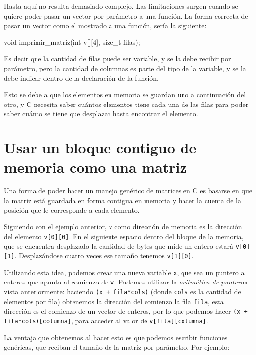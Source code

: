 Hasta aquí no resulta demasiado complejo.  Las limitaciones surgen cuando
se quiere poder pasar un vector por parámetro a una función.  La forma
correcta de pasar un vector como el mostrado a una función, sería la
siguiente:

\begin{codigo-c-plano}
void imprimir_matriz(int v[][4], size_t filas);
\end{codigo-c-plano}

Es decir que la cantidad de filas puede ser variable, y se la debe recibir
por parámetro, pero la cantidad de columnas es parte del tipo de la
variable, y se la debe indicar dentro de la declaración de la función.

Esto se debe a que los elementos en memoria se guardan uno a continuación
del otro, y C necesita saber cuántos elementos tiene cada una de las
filas para poder saber cuánto se tiene que desplazar hasta encontrar el
elemento.

\section{Usar un bloque contiguo de memoria como una matriz}

Una forma de poder hacer un manejo genérico de matrices en C es basarse en que
la matriz está guardada en forma contigua en memoria y hacer la cuenta de la
posición que le corresponde a cada elemento.

Siguiendo con el ejemplo anterior, \lstinline!v! como dirección de memoria
es la dirección del elemento \lstinline!v[0][0]!. En el siguiente espacio
dentro del bloque de la memoria, que se encuentra desplazado la cantidad de
bytes que mide un entero estará \lstinline!v[0][1]!. Desplazándose cuatro
veces ese tamaño tenemos \lstinline!v[1][0]!.

Utilizando esta idea, podemos crear una nueva variable \lstinline!x!, que sea
un puntero a enteros que apunta al comienzo de \lstinline!v!. Podemos utilizar
la \emph{aritmética de punteros} vista anteriormente: haciendo
\lstinline!(x + fila*cols)! (donde \lstinline!cols! es la cantidad de
elementos por fila) obtenemos la dirección del comienzo la fila
\lstinline!fila!, esta dirección es el comienzo de un vector de enteros, por
lo que podemos hacer \lstinline!(x + fila*cols)[columna]!, para acceder al
valor de \lstinline!v[fila][columna]!.

La ventaja que obtenemos al hacer esto es que podemos escribir funciones
genéricas, que reciban el tamaño de la matriz por parámetro. Por ejemplo:

